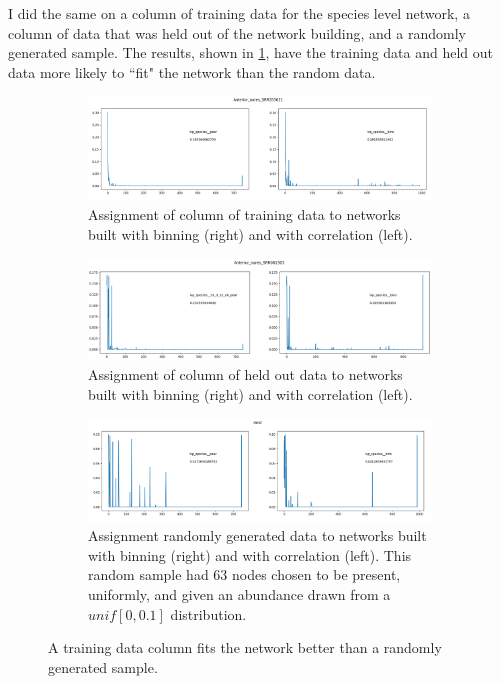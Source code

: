 \documentclass[10pt]{article}
\theoremstyle{definition}
\numberwithin{theorem}{section}
\numberwithin{definition}{section}
\numberwithin{lemma}{section}
\numberwithin{corollary}{section}
\numberwithin{clm}{section}
\numberwithin{rmk}{section}
\begin{document}
I did the same on a column of training data for the species level network, a column of data that was held out of the network building, and a randomly generated sample. The results, shown in \cref{full_assign}, have the training data and held out data more likely to ``fit" the network than the random data.

\begin{figure}
	\begin{subfigure}[b]{0.9\linewidth}
	\begin{center}
	\includegraphics[scale = 0.45]{a_nares.png}	
	\end{center}
	\caption{Assignment of column of training data to networks built with binning (right) and with correlation (left).}
	\end{subfigure}
	\begin{subfigure}[b]{0.9\linewidth}
	\begin{center}
		\includegraphics[scale = 0.45]{hldouts.png}	
	\end{center}
	\caption{Assignment of column of held out data to networks built with binning (right) and with correlation (left).}
\end{subfigure}
	\begin{subfigure}[b]{0.9\linewidth}
	\begin{center}
	\includegraphics[scale = 0.45]{random.png}	
	\end{center}
	\caption{Assignment randomly generated data to networks built with binning (right) and with correlation (left). This random sample had 63 nodes chosen to be present, uniformly, and given an abundance drawn from a $unif[0,0.1]$ distribution.}
	\end{subfigure}
\caption{A training data column fits the network better than a randomly generated sample.}\label{full_assign}
\end{figure}
\end{document}
